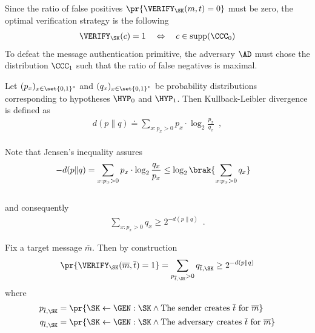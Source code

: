 \documentclass[landscape,footrule]{foils}
\begin{document}
Since the ratio of false positives $\pr{\VERIFY_\SK(m,t)=0}$ must be
zero, the optimal verification strategy is the following
 \begin{align*}
   \VERIFY_\SK(c)=1 \quad\Leftrightarrow\quad c\in \supp(\CCC_0)
 \end{align*}
 To defeat the message authentication primitive, the adversary $\AD$
 must chose the distribution $\CCC_1$ such that the ratio of false
 negatives is maximal.

\enlargethispage{3cm}

Let $(p_x)_{x\in\set{0,1}^*}$ and $(q_x)_{x\in\set{0,1}^*}$ be
probability distributions corresponding to hypotheses $\HYP_0$ and
$\HYP_1$. Then Kullback-Leibler divergence is defined as\vspace*{-1ex}
\begin{align*}
  d(p\|q)\doteq\sum_{x: p_x>0} p_x\cdot  \log_2\frac{p_x}{q_x}\enspace,
\end{align*}\ \vspace*{-3ex}\\
Note that Jensen's inequality assures\vspace*{-1.5ex}
\begin{align*}
  -d(p\|q)&=\sum_{x:p_x>0} p_x\cdot \log_2\frac{q_x}{p_x}\leq
  \log_2 \brak{\sum_{x:p_x>0} q_x}
\end{align*}\ \vspace{-3ex}\\
and consequently\vspace*{-1ex}
\begin{align*}
\sum_{x:p_x>0}q_x\geq 2^{-d(p\|q)}\enspace.
\end{align*}



Fix a target message $\overline{m}$. Then by construction
\begin{align*}
  \pr{\VERIFY_\SK(\overline{m},\overline{t})=1}=\sum_{p_{\overline{t},\SK}>0}q_{\overline{t},\SK}\geq
  2^{-d(p\|q)}
\end{align*}
where
\begin{align*}
  p_{\overline{t},\SK}&=\pr{\SK\gets\GEN:\SK\wedge \text{The sender
      creates }
    \overline{t} \text{ for } \overline{m}}\\
  q_{\overline{t},\SK}&=\pr{\SK\gets\GEN:\SK\wedge \text{The adversary
      creates } \overline{t}\text{ for } \overline{m}}
\end{align*}
\end{document}
